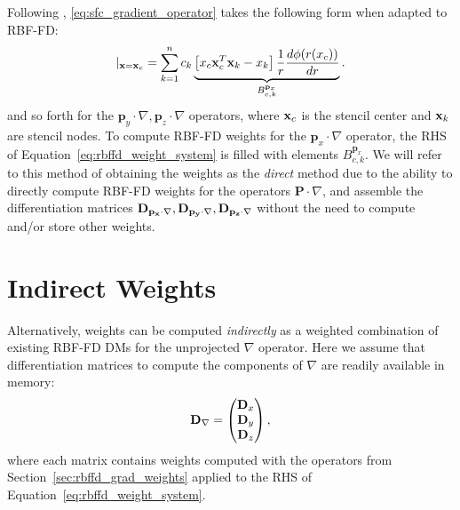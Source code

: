 Following \cite{FlyerLehto11}, \ref{eq:sfc_gradient_operator} takes the following form when adapted to RBF-FD:  
\begin{equation}
[ \mathbf{p}_{x} \cdot \nabla{f(\vx)}] |_{\vx = \vx_{c}} = \sum_{k=1}^{n} c_{k} \underbrace{\left[ x_{c} \vx_{c}^{T} \vx_{k} - x_{k} \right] \frac{1}{r} \d{\phi(r(x_{c}))}{r}}_{B_{c,k}^{\mathbf{p}_{x}}}. 
\label{eq:xsfc_operator_flyer_et_al}
\end{equation}
and so forth for the $\mathbf{p}_{y} \cdot \nabla, \mathbf{p}_{z}  \cdot \nabla$ operators, where $\mathbf{x}_{c}$ is the stencil center and $\mathbf{x}_{k}$ are stencil nodes. To compute RBF-FD weights for the $\mathbf{p}_{x} \cdot \nabla$ operator, the RHS of Equation~\ref{eq:rbffd_weight_system} is filled with elements $B_{c,k}^{\mathbf{p}_{x}}$. We will refer to this method of obtaining the weights as the \emph{direct} method due to the ability to directly compute RBF-FD weights for the operators $\mathbf{P} \cdot \nabla $, and assemble the differentiation matrices $\mathbf{D}_{\mathbf{p_{x}} \cdot \nabla}, \mathbf{D}_{\mathbf{p_{y}} \cdot \nabla}, \mathbf{D}_{\mathbf{p_{z}} \cdot \nabla}$ without the need to compute   and/or store other weights.

\section{Indirect Weights} 


Alternatively, weights can be computed \emph{indirectly} as a weighted combination of existing RBF-FD DMs for the unprojected $\nabla$ operator. Here we assume that differentiation matrices to compute the components of $\nabla$ are readily available in memory: 
$$
\mathbf{D}_{\nabla} = \begin{pmatrix} \mathbf{D}_{x} \\ \mathbf{D}_{y} \\ \mathbf{D}_{z} \end{pmatrix},
$$
where each matrix contains weights computed with the operators from Section~\ref{sec:rbffd_grad_weights} applied to the RHS of Equation~\ref{eq:rbffd_weight_system}.  

